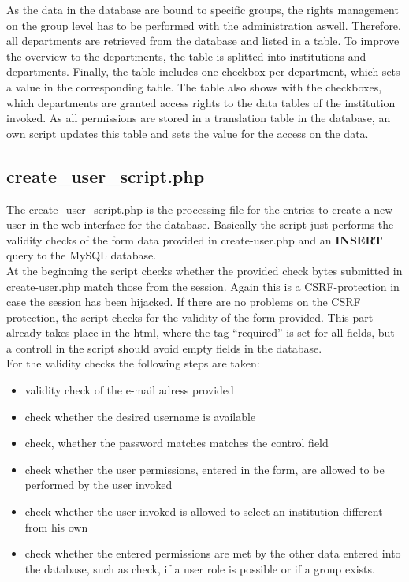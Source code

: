 As the data in the database are bound to specific groups, the rights management on the group level has to be performed with the administration aswell. Therefore, all departments are 
retrieved from the database and listed in a table. To improve the overview to the departments, the table is splitted into institutions and departments. Finally, the table includes 
one checkbox per department, which sets a value in the corresponding table. The table also shows with the checkboxes, which departments are granted access rights to the data tables 
of the institution invoked. As all permissions are stored in a translation table in the database, an own script updates this table 
and sets the value for the access on the data.

\subsection{create\_user\_script.php}
The create\_user\_script.php is the processing file for the entries to create a new user in the web interface for the database. Basically the script just performs the validity checks 
of the form data provided in create-user.php and an \textbf{INSERT} query to the MySQL database.\\
At the beginning the script checks whether the provided check bytes submitted in create-user.php match those from the session. Again this is a CSRF-protection in case the session has
been hijacked. If there are no problems on the CSRF protection, the script checks for the validity of the form provided. This part already takes place in the html, where the tag 
``required'' is set for all fields, but a controll in the script should avoid empty fields in the database.\\
For the validity checks the following steps are taken:
\begin{itemize}
 \item validity check of the e-mail adress provided
 \item check whether the desired username is available
 \item check, whether the password matches matches the control field
 \item check whether the user permissions, entered in the form, are allowed to be performed by the user invoked
 \item check whether the user invoked is allowed to select an institution different from his own
 \item check whether the entered permissions are met by the other data entered into the database, such as check, if a user role is possible or if a group exists.
\end{itemize}
